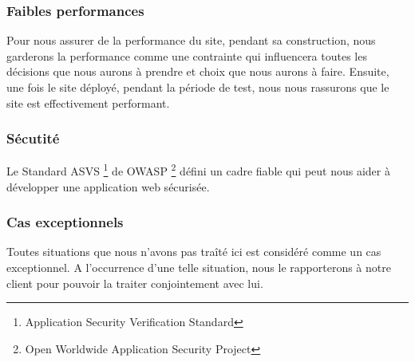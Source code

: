 			\subsubsection{Faibles performances}
				Pour nous assurer de la performance du site, pendant sa construction, nous garderons la performance comme une contrainte qui influencera toutes les d\'ecisions que nous aurons \`a prendre et choix que nous aurons \`a faire. Ensuite, une fois le site d\'eploy\'e, pendant la p\'eriode de test, nous nous rassurons que le site est effectivement performant.

			\subsubsection{S\'ecutit\'e}
				Le Standard ASVS \footnote{Application Security Verification Standard} de OWASP \footnote{Open Worldwide Application Security Project} d\'efini un cadre fiable qui peut nous aider \`a d\'evelopper une application web s\'ecuris\'ee. 

			\subsubsection{Cas exceptionnels}
				Toutes situations que nous n'avons pas tra\^it\'e ici est consid\'er\'e comme un cas exceptionnel. A l'occurrence d'une telle situation, nous le rapporterons \`a notre client pour pouvoir la traiter conjointement avec lui.